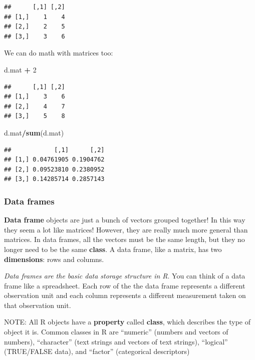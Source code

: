 \documentclass[]{article}
\newenvironment{Shaded}{\begin{snugshade}}{\end{snugshade}}
\newcommand{\KeywordTok}[1]{\textcolor[rgb]{0.13,0.29,0.53}{\textbf{#1}}}
\newcommand{\DecValTok}[1]{\textcolor[rgb]{0.00,0.00,0.81}{#1}}
\newcommand{\StringTok}[1]{\textcolor[rgb]{0.31,0.60,0.02}{#1}}
\newcommand{\OperatorTok}[1]{\textcolor[rgb]{0.81,0.36,0.00}{\textbf{#1}}}
\newcommand{\NormalTok}[1]{#1}
\begin{document}
\begin{verbatim}
##      [,1] [,2]
## [1,]    1    4
## [2,]    2    5
## [3,]    3    6
\end{verbatim}

We can do math with matrices too:

\begin{Shaded}
\begin{Highlighting}[]
\NormalTok{d.mat }\OperatorTok{+}\StringTok{ }\DecValTok{2}
\end{Highlighting}
\end{Shaded}

\begin{verbatim}
##      [,1] [,2]
## [1,]    3    6
## [2,]    4    7
## [3,]    5    8
\end{verbatim}

\begin{Shaded}
\begin{Highlighting}[]
\NormalTok{d.mat}\OperatorTok{/}\KeywordTok{sum}\NormalTok{(d.mat)}
\end{Highlighting}
\end{Shaded}

\begin{verbatim}
##            [,1]      [,2]
## [1,] 0.04761905 0.1904762
## [2,] 0.09523810 0.2380952
## [3,] 0.14285714 0.2857143
\end{verbatim}

\subsubsection{Data frames}\label{data-frames}

\textbf{Data frame} objects are just a bunch of vectors grouped
together! In this way they seem a lot like matrices! However, they are
really much more general than matrices. In data frames, all the vectors
must be the same length, but they no longer need to be the same
\textbf{class}. A data frame, like a matrix, has two
\textbf{dimensions}: rows and columns.

\emph{Data frames are the basic data storage structure in R}. You can
think of a data frame like a spreadsheet. Each row of the the data frame
represents a different observation unit and each column represents a
different measurement taken on that observation unit.

NOTE: All R objects have a \textbf{property} called \textbf{class},
which describes the type of object it is. Common classes in R are
``numeric'' (numbers and vectors of numbers), ``character'' (text
strings and vectors of text strings), ``logical'' (TRUE/FALSE data), and
``factor'' (categorical descriptors)
\end{document}
